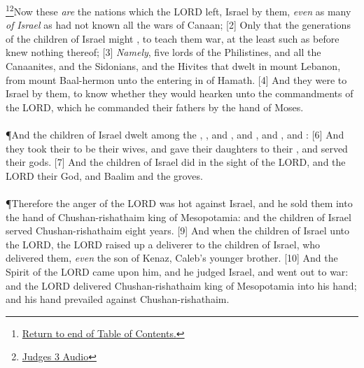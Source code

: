 \footnote{\textcolor[cmyk]{0.99998,1,0,0}{\hyperlink{TOC}{Return to end of Table of Contents.}}}\footnote{\href{https://audiobible.com/bible/judges_3.html}{\textcolor[cmyk]{0.99998,1,0,0}{Judges 3 Audio}}}\textcolor[cmyk]{0.99998,1,0,0}{Now these \emph{are} the nations which the LORD left,  Israel by them, \emph{even} as many \emph{of} \emph{Israel} as had not known all the wars of Canaan;}
[2] \textcolor[cmyk]{0.99998,1,0,0}{Only that the generations of the children of Israel might , to teach them war, at the least such as before knew nothing thereof;}
[3] \textcolor[cmyk]{0.99998,1,0,0}{\emph{Namely}, five lords of the Philistines, and all the Canaanites, and the Sidonians, and the Hivites that dwelt in mount Lebanon, from mount Baal-hermon unto the entering in of Hamath.}
[4] \textcolor[cmyk]{0.99998,1,0,0}{And they were to  Israel by them, to know whether they would hearken unto the commandments of the LORD, which he commanded their fathers by the hand of Moses.}\\
\\
\P \textcolor[cmyk]{0.99998,1,0,0}{And the children of Israel dwelt among the , , and , and , and , and :}
[6] \textcolor[cmyk]{0.99998,1,0,0}{And they took their  to be their wives, and gave their daughters to their , and served their gods.}
[7] \textcolor[cmyk]{0.99998,1,0,0}{And the children of Israel did  in the sight of the LORD, and  the LORD their God, and  Baalim and the groves.}\\
\\
\P \textcolor[cmyk]{0.99998,1,0,0}{Therefore the anger of the LORD was hot against Israel, and he sold them into the hand of Chushan-rishathaim king of Mesopotamia: and the children of Israel served Chushan-rishathaim eight years.}
[9] \textcolor[cmyk]{0.99998,1,0,0}{And when the children of Israel  unto the LORD, the LORD raised up a deliverer to the children of Israel, who delivered them, \emph{even}  the son of Kenaz, Caleb's younger brother.}
[10] \textcolor[cmyk]{0.99998,1,0,0}{And the Spirit of the LORD came upon him, and he judged Israel, and went out to war: and the LORD delivered Chushan-rishathaim king of Mesopotamia into his hand; and his hand prevailed against Chushan-rishathaim.}
